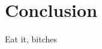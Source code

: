 \documentclass[10pt]{article}
\begin{document}





\section{Conclusion}
Eat it, bitches


\nocite{Moreno03}



\end{document}
